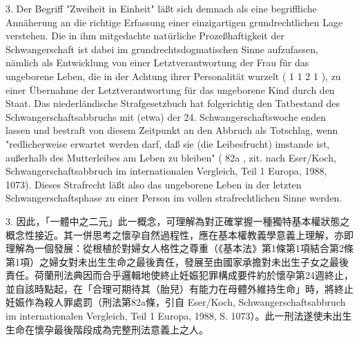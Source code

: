 \documentclass[12pt]{article}
\begin{document}
\begin{sourcepara}[title={原文SondervotumMS.283}]
3. Der Begriff "Zweiheit in Einheit" läßt sich demnach als eine begriffliche Annäherung an die richtige Erfassung einer einzigartigen grundrechtlichen Lage verstehen. Die in ihm mitgedachte natürliche Prozeßhaftigkeit der Schwangerschaft ist dabei im grundrechtsdogmatischen Sinne aufzufassen, nämlich als Entwicklung von einer Letztverantwortung der Frau für das ungeborene Leben, die in der Achtung ihrer Personalität wurzelt (\abbrArt{} 1 \abbrAbs{} 1 \abbrIVm{} \abbrArt{} 2 \abbrAbs{} 1 \abbrGG{}\ggfnArtOneOneTwoOneDE{}), zu einer Übernahme der Letztverantwortung für das ungeborene Kind durch den Staat. Das niederländische Strafgesetzbuch hat folgerichtig den Tatbestand des Schwangerschaftsabbruchs mit (etwa) der 24. Schwangerschaftswoche enden lassen und bestraft von diesem Zeitpunkt an den Abbruch als Totschlag, wenn "redlicherweise erwartet werden darf, daß sie (die Leibesfrucht) imstande ist, außerhalb des Mutterleibes am Leben zu bleiben" (\abbrArt{} 82a \abbrStGB{}, zit. nach Eser/Koch, Schwangerschaftsabbruch im internationalen Vergleich, Teil 1 Europa, 1988, \abbrS{} 1073). Dieses Strafrecht läßt also das ungeborene Leben in der letzten Schwangerschaftsphase zu einer Person im vollen strafrechtlichen Sinne werden.
\end{sourcepara}
\begin{transpara}
3. 因此，「一體中之二元」此一概念，可理解為對正確掌握一種獨特基本權狀態之概念性接近。其一併思考之懷孕自然過程性，應在基本權教義學意義上理解，亦即理解為一個發展：從根植於對婦女人格性之尊重（《基本法》第1條第1項結合第2條第1項\ggfnArtOneOneTwoOneZH{}）之婦女對未出生生命之最後責任，發展至由國家承擔對未出生子女之最後責任。荷蘭刑法典因而合乎邏輯地使終止妊娠犯罪構成要件約於懷孕第24週終止，並自該時點起，在「合理可期待其（胎兒）有能力在母體外維持生命」時，將終止妊娠作為殺人罪處罰（刑法第82a條，引自 Eser/Koch, Schwangerschaftsabbruch im internationalen Vergleich, Teil 1 Europa, 1988, S. 1073）。此一刑法遂使未出生生命在懷孕最後階段成為完整刑法意義上之人。
\end{transpara}
\end{document}
